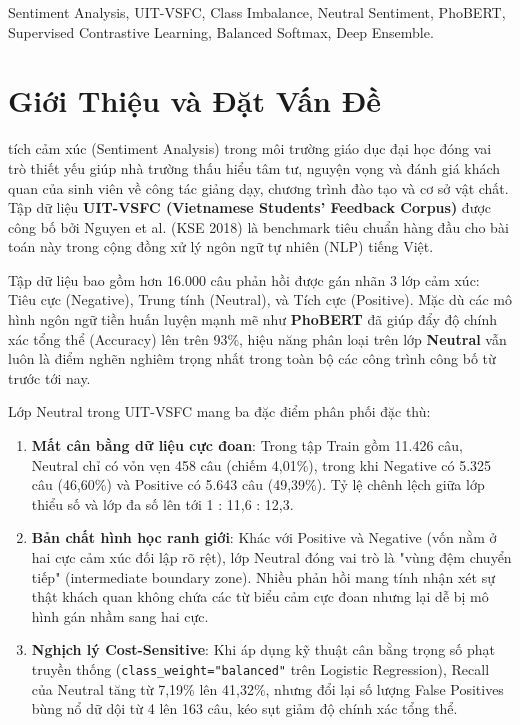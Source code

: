 \documentclass[10pt,journal,compsoc]{IEEEtran}
\begin{document}
{\begin{IEEEkeywords}
Sentiment Analysis, UIT-VSFC, Class Imbalance, Neutral Sentiment, PhoBERT, Supervised Contrastive Learning, Balanced Softmax, Deep Ensemble.
\end{IEEEkeywords}}

\maketitle
\IEEEdisplaynontitleabstractindextext
\IEEEpeerreviewmaketitle

\section{Giới Thiệu và Đặt Vấn Đề}
 tích cảm xúc (Sentiment Analysis) trong môi trường giáo dục đại học đóng vai trò thiết yếu giúp nhà trường thấu hiểu tâm tư, nguyện vọng và đánh giá khách quan của sinh viên về công tác giảng dạy, chương trình đào tạo và cơ sở vật chất. Tập dữ liệu \textbf{UIT-VSFC (Vietnamese Students' Feedback Corpus)} được công bố bởi Nguyen et al. (KSE 2018) \cite{nguyen2018uit} là benchmark tiêu chuẩn hàng đầu cho bài toán này trong cộng đồng xử lý ngôn ngữ tự nhiên (NLP) tiếng Việt.

Tập dữ liệu bao gồm hơn 16.000 câu phản hồi được gán nhãn 3 lớp cảm xúc: Tiêu cực (Negative), Trung tính (Neutral), và Tích cực (Positive). Mặc dù các mô hình ngôn ngữ tiền huấn luyện mạnh mẽ như \textbf{PhoBERT} \cite{nguyen2020phobert} đã giúp đẩy độ chính xác tổng thể (Accuracy) lên trên 93\%, hiệu năng phân loại trên lớp \textbf{Neutral} vẫn luôn là điểm nghẽn nghiêm trọng nhất trong toàn bộ các công trình công bố từ trước tới nay.

Lớp Neutral trong UIT-VSFC mang ba đặc điểm phân phối đặc thù:
\begin{enumerate}
    \item \textbf{Mất cân bằng dữ liệu cực đoan}: Trong tập Train gồm 11.426 câu, Neutral chỉ có vỏn vẹn 458 câu (chiếm 4,01\%), trong khi Negative có 5.325 câu (46,60\%) và Positive có 5.643 câu (49,39\%). Tỷ lệ chênh lệch giữa lớp thiểu số và lớp đa số lên tới 1 : 11,6 : 12,3.
    \item \textbf{Bản chất hình học ranh giới}: Khác với Positive và Negative (vốn nằm ở hai cực cảm xúc đối lập rõ rệt), lớp Neutral đóng vai trò là "vùng đệm chuyển tiếp" (intermediate boundary zone). Nhiều phản hồi mang tính nhận xét sự thật khách quan không chứa các từ biểu cảm cực đoan nhưng lại dễ bị mô hình gán nhầm sang hai cực.
    \item \textbf{Nghịch lý Cost-Sensitive}: Khi áp dụng kỹ thuật cân bằng trọng số phạt truyền thống (\texttt{class\_weight="balanced"} trên Logistic Regression), Recall của Neutral tăng từ 7,19\% lên 41,32\%, nhưng đổi lại số lượng False Positives bùng nổ dữ dội từ 4 lên 163 câu, kéo sụt giảm độ chính xác tổng thể.
\end{enumerate}
\end{document}
